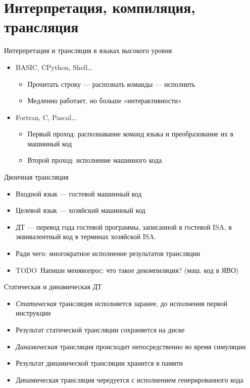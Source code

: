\documentclass{beamer}
\newcommand{\todo}[1][Напиши меня]{{\color{red}TODO\ #1}}
\begin{document}
\section{Интерпретация, компиляция, трансляция}

\begin{frame}{Интерпретация и трансляция в языках высокого уровня}
\begin{itemize}
\item BASIC, CPython, Shell\dots
    \begin{itemize}
    \item Прочитать строку — распознать команды — исполнить
    \item Медленно работает, но больше «интерактивности»
    \end{itemize}
\item Fortran, C, Pascal\dots
    \begin{itemize}
    \item Первый проход: распознавание команд языка и преобразование их в машинный код
    \item Второй проход: исполнение машинного кода
    \end{itemize}
\end{itemize}
\end{frame}

\begin{frame}{Двоичная трансляция}
\begin{itemize}
\item Входной язык — гостевой машинный код
\item Целевой язык — хозяйский машинный код
\item ДТ — перевод года гостевой программы, записанной в гостевой ISA, в эквивалентный код в терминах хозяйской ISA.
\item Ради чего: многократное исполнение результатов трансляции
\item \todo вопрос: что такое декомпиляция? (маш. код в ЯВО)
\end{itemize}
\end{frame}

\begin{frame}{Статическая и динамическая ДТ}
\begin{itemize}
    \item \textit{Статическая} трансляция исполняется заранее, до исполнения первой инструкции
    \item Результат статической трансляции сохраняется на диске
    \item \textit{Динамическая} трансляция происходит непосредственно во время симуляции
    \item Результат динамической трансляции хранится в памяти
    \item Динамическая трансляция чередуется с исполнением генерированного кода
\end{itemize}

\end{frame}
\end{document}
